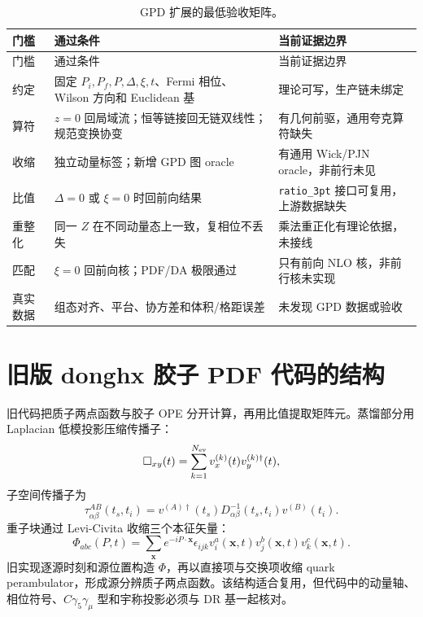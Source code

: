 \begin{longtable}{>{\raggedright\arraybackslash}p{3.2cm}>{\raggedright\arraybackslash}p{4.2cm}>{\raggedright\arraybackslash}p{6.4cm}}
\caption{GPD 扩展的最低验收矩阵。}\label{tab:b07-gpdgates}\\
\toprule
门槛 & 通过条件 & 当前证据边界\\
\midrule
\endfirsthead
\toprule
门槛 & 通过条件 & 当前证据边界\\
\midrule
\endhead
约定 & 固定 $P_i,P_f,P,\Delta,\xi,t$、Fermi 相位、Wilson 方向和 Euclidean 基 & 理论可写，生产链未绑定\\
算符 & $z=0$ 回局域流；恒等链接回无链双线性；规范变换协变 & 有几何前驱，通用夸克算符缺失\\
收缩 & 独立动量标签；新增 GPD 图 oracle & 有通用 Wick/PJN oracle，非前行未见\\
比值 & $\Delta=0$ 或 $\xi=0$ 时回前向结果 & \texttt{ratio\_3pt} 接口可复用，上游数据缺失\\
重整化 & 同一 $Z$ 在不同动量态上一致，复相位不丢失 & 乘法重正化有理论依据，未接线\\
匹配 & $\xi=0$ 回前向核；PDF/DA 极限通过 & 只有前向 NLO 核，非前行核未实现\\
真实数据 & 组态对齐、平台、协方差和体积/格距误差 & 未发现 GPD 数据或验收\\
\bottomrule
\end{longtable}

\section{旧版 donghx 胶子 PDF 代码的结构}

旧代码把质子两点函数与胶子 OPE 分开计算，再用比值提取矩阵元。蒸馏部分用 Laplacian 低模投影压缩传播子：
\begin{equation}
  \Box_{xy}(t)=\sum_{k=1}^{N_{\rm ev}}v_x^{(k)}(t)v_y^{(k)\dagger}(t),
  \label{eq:b07-distillation}
\end{equation}
子空间传播子为
\begin{equation}
  \tau_{\alpha\beta}^{AB}(t_s,t_i)
  =v^{(A)\dagger}(t_s)D^{-1}_{\alpha\beta}(t_s,t_i)v^{(B)}(t_i).
  \label{eq:b07-perambulator}
\end{equation}
重子块通过 Levi-Civita 收缩三个本征矢量：
\begin{equation}
  \Phi_{abc}(P,t)
  =\sum_{\mathbf x}e^{-iP\cdot\mathbf x}
  \epsilon_{ijk}v_i^a(\mathbf x,t)v_j^b(\mathbf x,t)v_k^c(\mathbf x,t).
  \label{eq:b07-vvv}
\end{equation}
旧实现逐源时刻和源位置构造 $\Phi$，再以直接项与交换项收缩 quark perambulator，形成源分辨质子两点函数。该结构适合复用，但代码中的动量轴、相位符号、$C\gamma_5\gamma_\mu$ 型和宇称投影必须与 DR 基一起核对。

